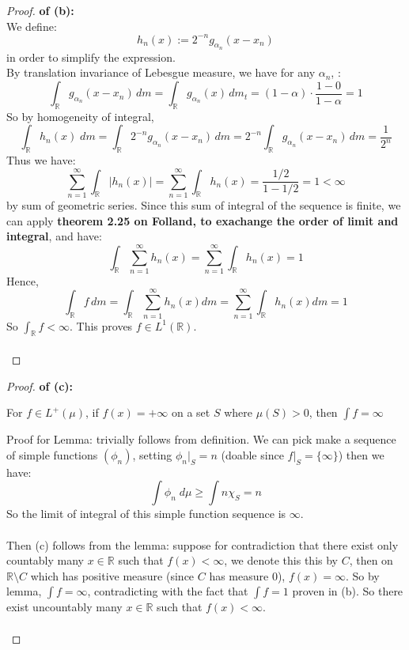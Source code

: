 \documentclass[lang=cn,11pt]{elegantbook}
\begin{document}
\begin{proof}
    \textbf{of (b):}\\
    We define: \[
    h_n(x) :=  2^{-n}g_{\alpha_n}(x - x_n)
    \] in order to simplify the expression.\\
By translation invariance of Lebesgue measure, we have for any $\alpha_n$, : \[
     \int_{\mathbb{R}} g_{\alpha_n}(x - x_n)\,dm =
     \int_{\mathbb{R}} g_{\alpha_n}(x)\,d m_t
     = (1-\alpha) \cdot \frac{1 - 0}{1-\alpha} = 1
   \]
So by homogeneity of integral,  \[
\int_{\mathbb{R}} h_n(x) \; d m =  \int_{\mathbb{R}} 2^{-n}g_{\alpha_n}(x - x_n)\,dm = 2^{-n}  \int_{\mathbb{R}} g_{\alpha_n}(x - x_n)\,d m  = \frac{1}{2^n}
\]
Thus we have: \[
\sum_{n=1}^\infty \int_{\mathbb{R}} |h_n(x)| = \sum_{n=1}^\infty \int_{\mathbb{R}} h_n(x) =  \frac{1/2}{1-1/2} = 1 < \infty
\] by sum of geometric series.
Since this sum of integral of the sequence is finite, we can apply \textbf{theorem 2.25 on Folland, to exachange the order of limit and integral}, and have: \[
 \int_{\mathbb{R}}  \sum_{n=1}^\infty h_n(x)   = \sum_{n=1}^\infty \int_{\mathbb{R}} h_n(x)  =1
\]
Hence,
\[
  \int_{\mathbb{R}} f \,d m
 =  \int_{\mathbb{R}}  \sum_{n=1}^\infty h_n(x)   dm = \sum_{n=1}^\infty  \int_{\mathbb{R}}  h_n(x)   dm  = 1
\]
So \(\int_{\mathbb{R}} f < \infty\).  This proves \(f\in L^1(\mathbb{R})\).\\\\
\end{proof}



\begin{proof}
\textbf{of (c):}
\begin{lemma}
    For $f \in L^+(\mu)$,   if $f(x) =+\infty$ on a set $S$ where $\mu(S) >0$, then $\int f = \infty$
\end{lemma}
Proof for Lemma: trivially follows from definition. We can pick make a sequence of simple functions $(\phi_n)$, setting $\phi_n |_S = n$ (doable since $f|_S = \{\infty\}$) then we have: \[
\int \phi_n \; d\mu \geq  \int  n  \chi_S = n
\]
So the limit of integral of this simple function sequence is $\infty$. \\\\
Then (c) follows from the lemma: suppose for contradiction that there exist only countably many $x\in\mathbb{R}$ such that $f(x)<\infty$, we denote this this by $C$, then on $\mathbb{R} \setminus C$ which has positive measure (since $C$ has measure 0), $f(x) = \infty$. So by lemma, $\int f = \infty$, contradicting with the fact that $\int f = 1$ proven in (b). So there exist uncountably many $x\in\mathbb{R}$ such that $f(x)<\infty$.\\\\
\end{proof}
\end{document}
